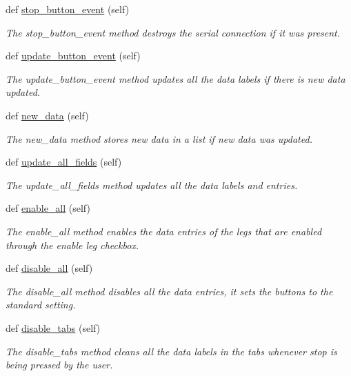 \begin{DoxyCompactItemize}
def \hyperlink{classuser__interface_1_1GUI_a6cafdec7e2cc0ca9a25429bdc44fd96e}{stop\+\_\+button\+\_\+event} (self)
\begin{DoxyCompactList}\small\item\em The stop\+\_\+button\+\_\+event method destroys the serial connection if it was present. \end{DoxyCompactList}\item 
def \hyperlink{classuser__interface_1_1GUI_a866b8e4bf0bc892cc6ae44a68041e006}{update\+\_\+button\+\_\+event} (self)
\begin{DoxyCompactList}\small\item\em The update\+\_\+button\+\_\+event method updates all the data labels if there is new data updated. \end{DoxyCompactList}\item 
def \hyperlink{classuser__interface_1_1GUI_a974d67b11bf11a3c6d30ca8ca3e86910}{new\+\_\+data} (self)
\begin{DoxyCompactList}\small\item\em The new\+\_\+data method stores new data in a list if new data was updated. \end{DoxyCompactList}\item 
def \hyperlink{classuser__interface_1_1GUI_a944eaec52425551da4af2534fb43d721}{update\+\_\+all\+\_\+fields} (self)
\begin{DoxyCompactList}\small\item\em The update\+\_\+all\+\_\+fields method updates all the data labels and entries. \end{DoxyCompactList}\item 
def \hyperlink{classuser__interface_1_1GUI_a37f5777ca2d7aea9186d1447ada28faa}{enable\+\_\+all} (self)
\begin{DoxyCompactList}\small\item\em The enable\+\_\+all method enables the data entries of the legs that are enabled through the enable leg checkbox. \end{DoxyCompactList}\item 
def \hyperlink{classuser__interface_1_1GUI_a2130bcd9bdd457ba51cac0458a8d3f96}{disable\+\_\+all} (self)
\begin{DoxyCompactList}\small\item\em The disable\+\_\+all method disables all the data entries, it sets the buttons to the standard setting. \end{DoxyCompactList}\item 
\mbox{\label{classuser__interface_1_1GUI_a4072fa3d862758acf88931dbd66fca83}} 
def \hyperlink{classuser__interface_1_1GUI_a4072fa3d862758acf88931dbd66fca83}{disable\+\_\+tabs} (self)
\begin{DoxyCompactList}\small\item\em The disable\+\_\+tabs method cleans all the data labels in the tabs whenever stop is being pressed by the user. \end{DoxyCompactList}\end{DoxyCompactItemize}
